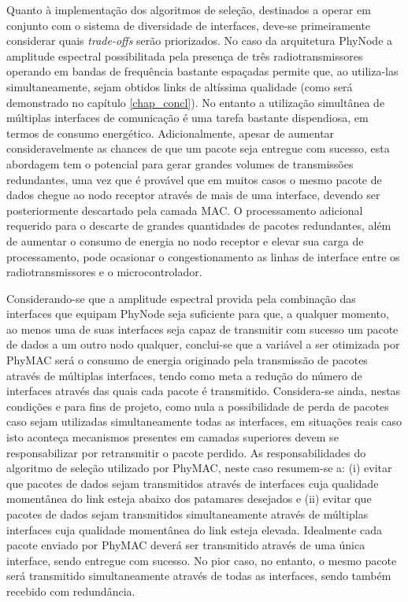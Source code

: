 \documentclass[
	12pt,				%
	openright,			%
	oneside,
	a4paper,			%
	english,			%
	french,				%
	spanish,			%
	brazil				%
	]{abntex2}
\begin{document}
Quanto à implementação dos algoritmos de seleção, destinados a operar em conjunto com o sistema de diversidade de interfaces, deve-se primeiramente considerar quais \textit{trade-offs} serão priorizados. No caso da arquitetura PhyNode a amplitude espectral possibilitada pela presença de três radiotransmissores operando em bandas de frequência bastante espaçadas permite que, ao utiliza-las simultaneamente, sejam obtidos links de altíssima qualidade (como será demonstrado no capítulo \ref{chap_concl}). No entanto a utilização simultânea de múltiplas interfaces de comunicação é uma tarefa bastante dispendiosa, em termos de consumo energético. Adicionalmente, apesar de aumentar consideravelmente as chances de que um pacote seja entregue com sucesso, esta abordagem tem o potencial para gerar grandes volumes de transmissões redundantes, uma vez que é provável que em muitos casos o mesmo pacote de dados chegue ao nodo receptor através de mais de uma interface, devendo ser posteriormente descartado pela camada MAC. O processamento adicional requerido para o descarte de grandes quantidades de pacotes redundantes, além de aumentar o consumo de energia no nodo receptor e elevar sua carga de processamento, pode ocasionar o congestionamento as linhas de interface entre os radiotransmissores e o microcontrolador.

Considerando-se que a amplitude espectral provida pela combinação das interfaces que equipam PhyNode seja suficiente para que, a qualquer momento, ao menos uma de suas interfaces seja capaz de transmitir com sucesso um pacote de dados a um outro nodo qualquer, conclui-se que a variável a ser otimizada por PhyMAC será o consumo de energia originado pela transmissão de pacotes através de múltiplas interfaces, tendo como meta a redução do número de interfaces através das quais cada pacote é transmitido. Considera-se ainda, nestas condições e para fins de projeto, como nula a possibilidade de perda de pacotes caso sejam utilizadas simultaneamente todas as interfaces, em situações reais caso isto aconteça mecanismos presentes em camadas superiores devem se responsabilizar por retransmitir o pacote perdido. As responsabilidades do algoritmo de seleção utilizado por PhyMAC, neste caso resumem-se a: (i) evitar que pacotes de dados sejam transmitidos através de interfaces cuja qualidade momentânea do link esteja abaixo dos patamares desejados e (ii) evitar que pacotes de dados sejam transmitidos simultaneamente através de múltiplas interfaces cuja qualidade momentânea do link esteja elevada. Idealmente cada pacote enviado por PhyMAC deverá ser transmitido através de uma única interface, sendo entregue com sucesso. No pior caso, no entanto, o mesmo pacote será transmitido simultaneamente através de todas as interfaces, sendo também recebido com redundância.
\end{document}
